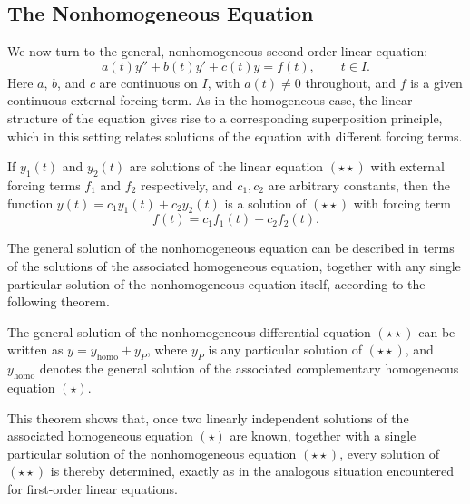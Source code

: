\subsection{The Nonhomogeneous Equation}

We now turn to the general, nonhomogeneous second-order linear equation:
\begin{equation*}
a(t) y'' + b(t) y' + c(t) y = f(t), \qquad t \in I. \tag{$\star\star$}
\end{equation*}
Here $a$, $b$, and $c$ are continuous on $I$, with $a(t) \neq 0$ throughout, and $f$ is a given continuous external forcing term. As in the homogeneous case, the linear structure of the equation gives rise to a corresponding superposition principle, which in this setting relates solutions of the equation with different forcing terms.

\begin{theorem}
If $y_1(t)$ and $y_2(t)$ are solutions of the linear equation $(\star\star)$ with external forcing terms $f_1$ and $f_2$ respectively, and $c_1, c_2$ are arbitrary constants, then the function $y(t) = c_1 y_1(t) + c_2 y_2(t)$ is a solution of $(\star\star)$ with forcing term
\[
f(t) = c_1 f_1(t) + c_2 f_2(t).
\]

\end{theorem}

The general solution of the nonhomogeneous equation can be described in terms of the solutions of the associated homogeneous equation, together with any single particular solution of the nonhomogeneous equation itself, according to the following theorem.

\begin{theorem}
The general solution of the nonhomogeneous differential equation $(\star\star)$ can be written as $y = y_{\text{homo}} + y_P$, where $y_P$ is any particular solution of $(\star\star)$, and $y_{\text{homo}}$ denotes the general solution of the associated complementary homogeneous equation $(\star)$.
\end{theorem}

This theorem shows that, once two linearly independent solutions of the associated homogeneous equation $(\star)$ are known, together with a single particular solution of the nonhomogeneous equation $(\star\star)$, every solution of $(\star\star)$ is thereby determined, exactly as in the analogous situation encountered for first-order linear equations.

